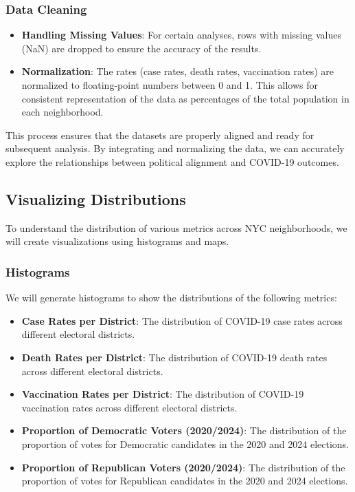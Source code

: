 \documentclass[10pt,journal,compsoc]{IEEEtran}
\begin{document}
\subsubsection{Data Cleaning}
\begin{itemize}
    \item \textbf{Handling Missing Values}: For certain analyses, rows with missing values (NaN) are dropped to ensure the accuracy of the results.
    \item \textbf{Normalization}: The rates (case rates, death rates, vaccination rates) are normalized to floating-point numbers between 0 and 1. This allows for consistent representation of the data as percentages of the total population in each neighborhood.
\end{itemize}

This process ensures that the datasets are properly aligned and ready for subsequent analysis. By integrating and normalizing the data, we can accurately explore the relationships between political alignment and COVID-19 outcomes.

\subsection{Visualizing Distributions}

To understand the distribution of various metrics across NYC neighborhoods, we will create visualizations using histograms and maps.

\subsubsection{Histograms}
We will generate histograms to show the distributions of the following metrics:
\begin{itemize}
    \item \textbf{Case Rates per District}: The distribution of COVID-19 case rates across different electoral districts.
    \item \textbf{Death Rates per District}: The distribution of COVID-19 death rates across different electoral districts.
    \item \textbf{Vaccination Rates per District}: The distribution of COVID-19 vaccination rates across different electoral districts.
    \item \textbf{Proportion of Democratic Voters (2020/2024)}: The distribution of the proportion of votes for Democratic candidates in the 2020 and 2024 elections.
    \item \textbf{Proportion of Republican Voters (2020/2024)}: The distribution of the proportion of votes for Republican candidates in the 2020 and 2024 elections.
\end{itemize}
\end{document}
